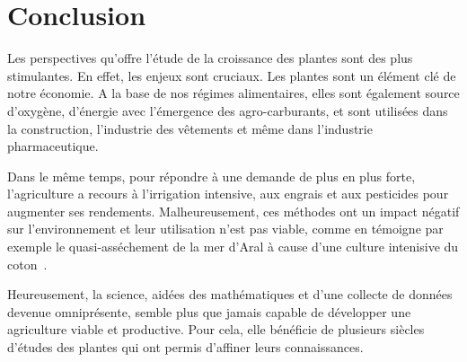 \section*{Conclusion}

Les perspectives qu'offre l'étude de la croissance des plantes sont des plus stimulantes.
En effet, les enjeux sont cruciaux. Les plantes sont un élément clé de notre économie. A la base de nos régimes alimentaires, elles sont également source d'oxygène, d'énergie avec l'émergence des agro-carburants, et sont utilisées dans la construction, l'industrie des vêtements et même dans l'industrie pharmaceutique.

Dans le même temps, pour répondre à une demande de plus en plus forte, l'agriculture a recours à l'irrigation intensive, aux engrais et aux pesticides pour augmenter ses rendements. Malheureusement, ces méthodes ont un impact négatif sur l'environnement et leur utilisation n'est pas viable, comme en témoigne par exemple le quasi-asséchement de la mer d'Aral à cause d'une culture intenisive du coton~\cite{aral}.
 
Heureusement, la science, aidées des mathématiques et d'une collecte de données devenue omniprésente, semble plus que jamais capable de développer une agriculture viable et productive. Pour cela, elle bénéficie de plusieurs siècles d'études des plantes qui ont permis d'affiner leurs connaissances.



